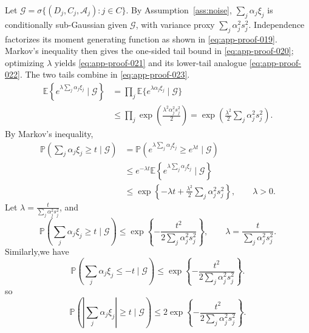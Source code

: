 \documentclass[11pt]{article}
\numberwithin{equation}{section}
\newcommand{\E}{\mathbb E}
\newcommand{\Pbb}{\mathbb P}
\newcommand{\1}{\mathbf 1}
\newcommand{\cA}{\mathcal A}
\newcommand{\abs}[1]{\left\lvert #1\right\rvert}
\begin{document}
Let \(\mathcal G=\sigma\{(D_j,C_j,\cA_j):j\in C\}\).  By Assumption~\ref{ass:noise}, \(\sum_j\alpha_j\xi_j\) is conditionally sub-Gaussian given \(\mathcal G\), with variance proxy \(\sum_j\alpha_j^2s_j^2\).  Independence
factorizes its moment generating function as shown in
\eqref{eq:app-proof-019}.  Markov's inequality then gives the one-sided tail
bound in \eqref{eq:app-proof-020}; optimizing \(\lambda\) yields
\eqref{eq:app-proof-021} and its lower-tail analogue \eqref{eq:app-proof-022}.
The two tails combine in \eqref{eq:app-proof-023}.
\begin{equation}
\label{eq:app-proof-019}
\begin{aligned}
\E\!\left\{e^{\lambda\sum_j\alpha_j\xi_j}\mid\mathcal G\right\}
&=\prod_j\E\{e^{\lambda\alpha_j\xi_j}\mid\mathcal G\}\\
&\le\prod_j\exp\!\left(\frac{\lambda^2\alpha_j^2s_j^2}{2}\right)
=\exp\!\left(\frac{\lambda^2}{2}\sum_j\alpha_j^2s_j^2\right).
\end{aligned}
\end{equation}
By Markov's inequality,
\begin{equation}
\label{eq:app-proof-020}
\begin{aligned}
\Pbb\!\left(\sum_j\alpha_j\xi_j\ge t\mid\mathcal G\right)
&=\Pbb\!\left(e^{\lambda\sum_j\alpha_j\xi_j}\ge e^{\lambda t}
\mid\mathcal G\right)\\
&\le e^{-\lambda t}
\E\!\left\{e^{\lambda\sum_j\alpha_j\xi_j}\mid\mathcal G\right\}\\
&\le\exp\!\left\{-\lambda t
+\frac{\lambda^2}{2}\sum_j\alpha_j^2s_j^2\right\},
\qquad \lambda>0.
\end{aligned}
\end{equation}
Let \(\lambda=\frac{t}{\sum_j\alpha_j^2s_j^2}\), and
\begin{equation}
\label{eq:app-proof-021}
\Pbb\!\left(\sum_j\alpha_j\xi_j\ge t\mid\mathcal G\right)
\le\exp\!\left\{-\frac{t^2}{2\sum_j\alpha_j^2s_j^2}\right\},
\qquad
\lambda=\frac{t}{\sum_j\alpha_j^2s_j^2}.
\end{equation}
Similarly,we have
\begin{equation}
\label{eq:app-proof-022}
\Pbb\!\left(\sum_j\alpha_j\xi_j\le-t\mid\mathcal G\right)
\le\exp\!\left\{-\frac{t^2}{2\sum_j\alpha_j^2s_j^2}\right\}.
\end{equation}
so
\begin{equation}
\label{eq:app-proof-023}
\Pbb\!\left(\abs{\sum_j\alpha_j\xi_j}\ge t\mid\mathcal G\right)
\le2\exp\!\left\{-\frac{t^2}{2\sum_j\alpha_j^2s_j^2}\right\}.
\end{equation}
\end{document}
